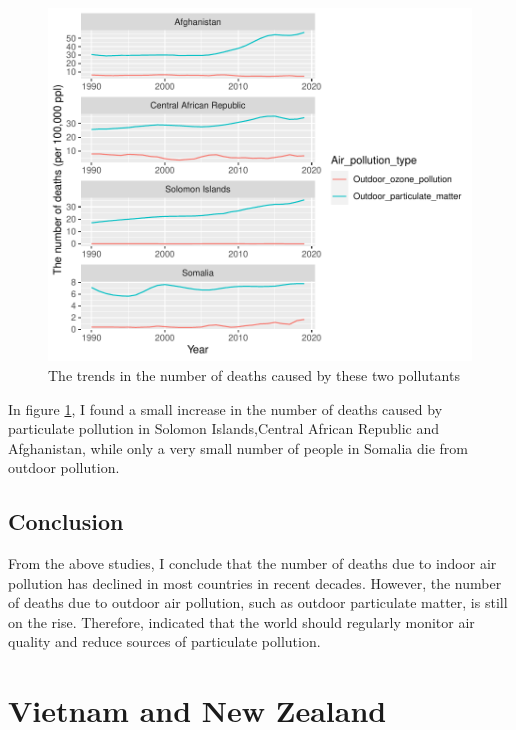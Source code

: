 \documentclass[11pt,a4paper,]{article}
\begin{document}
\begin{figure}[H]

{\centering \includegraphics{Assignment4_files/figure-latex/trendsfig-1} 

}

\caption{The trends in the number of deaths caused by these two pollutants}\label{fig:trendsfig}
\end{figure}

In figure \ref{fig:trendsfig}, I found a small increase in the number of deaths caused by particulate pollution in Solomon Islands,Central African Republic and Afghanistan, while only a very small number of people in Somalia die from outdoor pollution.

\hypertarget{conclusion}{%
\subsection{Conclusion}\label{conclusion}}

From the above studies, I conclude that the number of deaths due to indoor air pollution has declined in most countries in recent decades. However, the number of deaths due to outdoor air pollution, such as outdoor particulate matter, is still on the rise. Therefore, \textcite{neidell2004air} indicated that the world should regularly monitor air quality and reduce sources of particulate pollution.

\section*{Vietnam and New Zealand}
\end{document}
